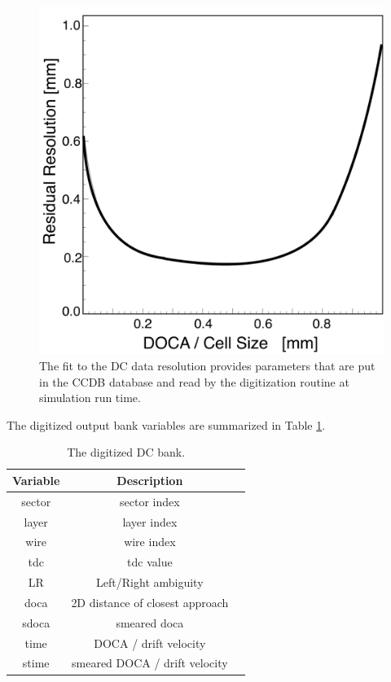 \begin{figure}
	\centering
	\includegraphics[width=0.99\columnwidth,keepaspectratio]{img/dcResolution.png}
	\caption{The fit to the DC data resolution provides parameters that are put in the CCDB database and read by
    the digitization routine at simulation run time.}
	\label{fig:dcResolution}
\end{figure}

The digitized output bank variables are summarized in Table \ref{tab:dcBank}.

\begin{table}[h]
	\begin{center}
		\begin{tabular}{| c | c | c |}
			\hline \hline
			Variable   & Description \\
			\hline
               sector  &                    sector index   \\
                layer  &                     layer index   \\
                 wire  &                      wire index   \\
                  tdc  &                       tdc value   \\
                   LR  &            Left/Right ambiguity   \\
                 doca  & 2D distance of closest approach   \\
                sdoca  &                    smeared doca   \\
                 time  &           DOCA / drift velocity   \\
                stime  &   smeared DOCA / drift velocity   \\
			\hline \hline
		\end{tabular}
	\end{center}
	\caption{The digitized DC bank.}\label{tab:dcBank}
\end{table}


